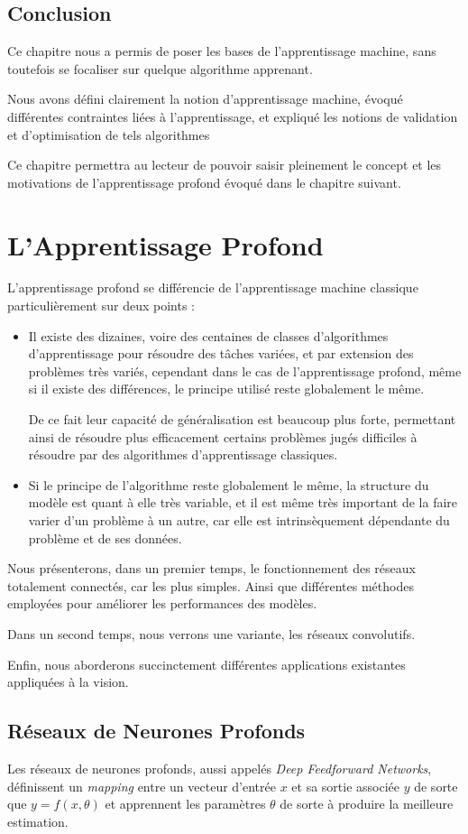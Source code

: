 \documentclass[a4paper, 11pt]{report}
\begin{document}
\section{Conclusion}
Ce chapitre nous a permis de poser les bases de l'apprentissage machine, sans toutefois se focaliser sur quelque algorithme apprenant.

Nous avons défini clairement la notion d'apprentissage machine, évoqué différentes contraintes liées à l'apprentissage, et expliqué les notions de validation et d'optimisation de tels algorithmes

Ce chapitre permettra au lecteur de pouvoir saisir pleinement le concept et les motivations de l'apprentissage profond évoqué dans le chapitre suivant.

\chapter{L'Apprentissage Profond}
L'apprentissage profond se différencie de l'apprentissage machine classique particulièrement sur deux points :
\begin{itemize}
	\item Il existe des dizaines, voire des centaines de classes d'algorithmes d'apprentissage pour résoudre des tâches variées, et par extension des problèmes très variés, cependant dans le cas de l'apprentissage profond, même si il existe des différences, le principe utilisé reste globalement le même.
	
	De ce fait leur capacité de généralisation est beaucoup plus forte, permettant ainsi de résoudre plus efficacement certains problèmes jugés difficiles à résoudre par des algorithmes d'apprentissage classiques.
	\item Si le principe de l'algorithme reste globalement le même, la structure du modèle est quant à elle très variable, et il est même très important de la faire varier d'un problème à un autre, car elle est intrinsèquement dépendante du problème et de ses données.
	      \end{itemize}
Nous présenterons, dans un premier temps, le fonctionnement des réseaux totalement connectés, car les plus simples. Ainsi que différentes méthodes employées pour améliorer les performances des modèles.

Dans un second temps, nous verrons une variante, les réseaux convolutifs.

Enfin, nous aborderons succinctement différentes applications existantes appliquées à la vision.
\section{Réseaux de Neurones Profonds}
Les réseaux de neurones profonds, aussi appelés \emph{Deep Feedforward Networks}, définissent un \emph{mapping} entre un vecteur d'entrée $x$ et sa sortie associée $y$ de sorte que $y = f(x,\theta)$ et apprennent les paramètres $\theta$ de sorte à produire la meilleure estimation.
\end{document}
